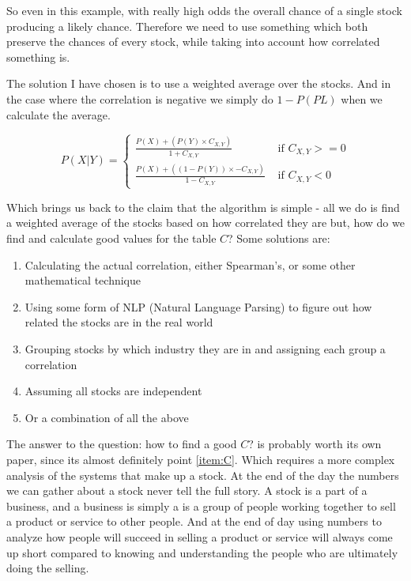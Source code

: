 \documentclass[12pt]{article}
\begin{document}
    So even in this example, with really high odds the overall chance of a single stock
    producing a likely chance. Therefore we need to use something which both preserve
    the chances of every stock, while taking into account how correlated something is.

    The solution I have chosen is to use a weighted average over the stocks.
    And in the case where the correlation is negative we simply do \(1 - P(PL)\)
    when we calculate the average.

    \begin{equation} \label{eq:StockWeight}
        P ( X | Y ) = 
        \begin{cases}
            \displaystyle\frac 
                {P( X ) + (P ( Y ) \times C_{X, Y})}
                {1 + C_{X, Y}} 
                & \text{ if } C_{X, Y} >= 0\\
            \displaystyle\frac
                {P( X ) + ((1 - P ( Y )) \times - C_{X, Y})}
                {1 - C_{X, Y}} 
                & \text{ if } C_{X, Y} < 0
        \end{cases}
    \end{equation}

    Which brings us back to the claim that the algorithm is simple - all we do is find a
    weighted average of the stocks based on how correlated they are but, how do we find 
    and calculate good values for the table \(C\)? Some solutions are:

    \begin{enumerate}
        \item{Calculating the actual correlation, either Spearman's, or some other mathematical technique}
        \item{Using some form of NLP (Natural Language Parsing) to figure out how related the stocks are in the real world}
        \item{Grouping stocks by which industry they are in and assigning each group a correlation}
        \item{Assuming all stocks are independent}
        \item{Or a combination of all the above}\label{item:C}
    \end{enumerate}

    The answer to the question: how to find a good \(C\)? is probably worth its own paper, since
    its almost definitely point \ref{item:C}. Which requires a more complex analysis of the systems
    that make up a stock. At the end of the day the numbers we can gather about a stock never
    tell the full story. A stock is a part of a business, and a business is simply a is a
    group of people working together to sell a product or service to other people.
    And at the end of day using numbers to analyze how people will succeed in selling
    a product or service will always come up short compared to knowing and understanding
    the people who are ultimately doing the selling.
\end{document}
